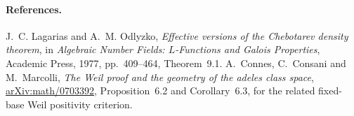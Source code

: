 \documentclass[11pt]{article}
\begin{document}
\paragraph{References.}
J.~C. Lagarias and A.~M. Odlyzko, \emph{Effective versions of the Chebotarev
density theorem}, in \emph{Algebraic Number Fields: \(L\)-Functions and Galois
Properties}, Academic Press, 1977, pp.~409--464, Theorem~9.1.
A.~Connes, C.~Consani and M.~Marcolli, \emph{The Weil proof and the geometry
of the adeles class space}, \href{https://arxiv.org/abs/math/0703392}{arXiv:math/0703392},
Proposition~6.2 and Corollary~6.3, for the related fixed-base Weil
positivity criterion.
\end{document}
